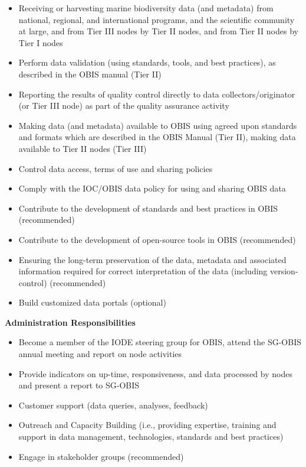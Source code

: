 \documentclass[
  letterpaper,
  DIV=11,
  numbers=noendperiod,
  oneside]{scrreprt}
\providecommand{\tightlist}{%
  \setlength{\itemsep}{0pt}\setlength{\parskip}{0pt}}\usepackage{longtable,booktabs,array}
\begin{document}
\begin{itemize}
\tightlist
\item
  Receiving or harvesting marine biodiversity data (and metadata) from
  national, regional, and international programs, and the scientific
  community at large, and from Tier III nodes by Tier II nodes, and from
  Tier II nodes by Tier I nodes
\item
  Perform data validation (using standards, tools, and best practices),
  as described in the OBIS manual (Tier II)
\item
  Reporting the results of quality control directly to data
  collectors/originator (or Tier III node) as part of the quality
  assurance activity
\item
  Making data (and metadata) available to OBIS using agreed upon
  standards and formats which are described in the OBIS Manual (Tier
  II), making data available to Tier II nodes (Tier III)
\item
  Control data access, terms of use and sharing policies
\item
  Comply with the IOC/OBIS data policy for using and sharing OBIS data
\item
  Contribute to the development of standards and best practices in OBIS
  (recommended)
\item
  Contribute to the development of open-source tools in OBIS
  (recommended)
\item
  Ensuring the long-term preservation of the data, metadata and
  associated information required for correct interpretation of the data
  (including version-control) (recommended)
\item
  Build customized data portals (optional)
\end{itemize}

\textbf{Administration Responsibilities}

\begin{itemize}
\tightlist
\item
  Become a member of the IODE steering group for OBIS, attend the
  SG-OBIS annual meeting and report on node activities
\item
  Provide indicators on up-time, responsiveness, and data processed by
  nodes and present a report to SG-OBIS
\item
  Customer support (data queries, analyses, feedback)
\item
  Outreach and Capacity Building (i.e., providing expertise, training
  and support in data management, technologies, standards and best
  practices)
\item
  Engage in stakeholder groups (recommended)
\end{itemize}
\end{document}
